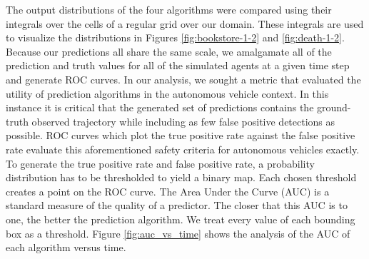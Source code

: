 \documentclass[letterpaper,10pt,conference]{ieeeconf}
\begin{document}
The output distributions of the four algorithms were compared using their integrals over the cells of a regular grid over our domain. 
These integrals are used to visualize the distributions in Figures \ref{fig:bookstore-1-2} and \ref{fig:death-1-2}.
Because our predictions all share the same scale, we amalgamate all of the prediction and truth values for all of the simulated agents at a given time step and generate ROC curves.
In our analysis, we sought a metric that evaluated the utility of prediction algorithms in the autonomous vehicle context. 
	In this instance it is critical that the generated set of predictions contains the ground-truth observed trajectory while including as few false positive detections as possible.
	ROC curves which plot the true positive rate against the false positive rate evaluate this aforementioned safety criteria for autonomous vehicles exactly. To generate the true positive rate and false positive rate, a probability distribution has to be thresholded to yield a binary map. Each chosen threshold creates a point on the ROC curve.
	The Area Under the Curve (AUC) is a standard measure of the quality of a predictor.  
	The closer that this AUC is to one, the better the prediction algorithm. We treat every value of each bounding box as a threshold.
	Figure \ref{fig:auc_vs_time} shows the analysis of the AUC of each algorithm versus time.
	
\end{document}
